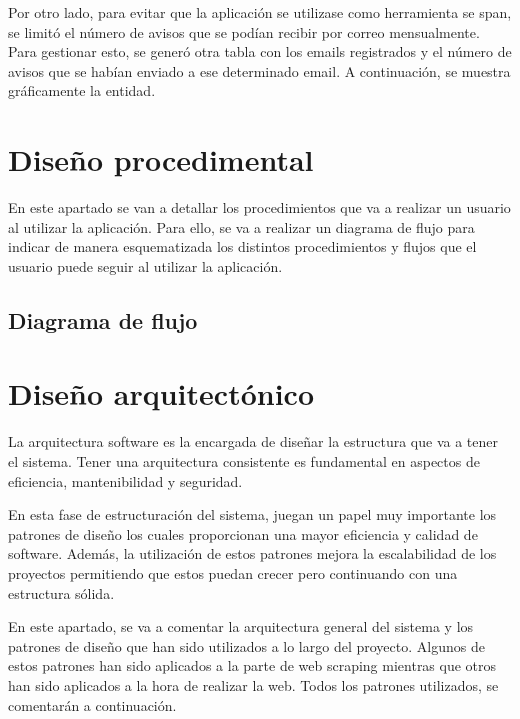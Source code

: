 
Por otro lado, para evitar que la aplicación se utilizase como herramienta se span, se limitó el número de avisos que se podían recibir por correo mensualmente. Para gestionar esto, se generó otra tabla con los emails registrados y el número de avisos que se habían enviado a ese determinado email. A continuación, se muestra gráficamente la entidad.


\section{Diseño procedimental}

En este apartado se van a detallar los procedimientos que va a realizar un usuario al utilizar la aplicación. Para ello, se va a realizar un diagrama de flujo para indicar de manera esquematizada los distintos procedimientos y flujos que el usuario puede seguir al utilizar la aplicación. 

\newpage
\begin{landscape}
\subsection{Diagrama de flujo}
\end{landscape}
\newpage

\section{Diseño arquitectónico}
La arquitectura software es la encargada de diseñar la estructura que va a tener el sistema. Tener una arquitectura consistente es fundamental en aspectos de eficiencia, mantenibilidad y seguridad.

En esta fase de estructuración del sistema, juegan un papel muy importante los patrones de diseño los cuales proporcionan una mayor eficiencia y calidad de software.
Además, la utilización de estos patrones mejora la escalabilidad de los proyectos permitiendo que estos puedan crecer pero continuando con una estructura sólida.

En este apartado, se va a comentar la arquitectura general del sistema y los patrones de diseño que han sido utilizados a lo largo del proyecto. Algunos de estos patrones han sido aplicados a la parte de web scraping mientras que otros han sido aplicados a la hora de realizar la web. Todos los patrones utilizados, se comentarán a continuación.

